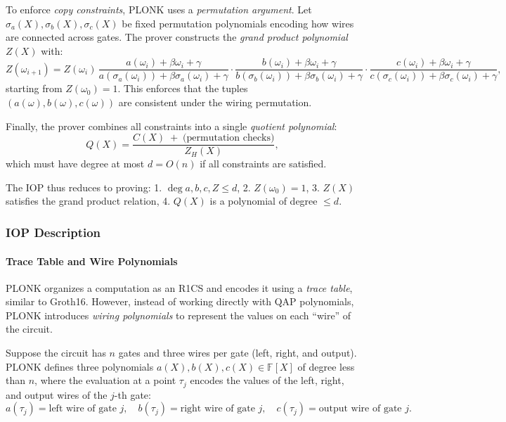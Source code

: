 To enforce \emph{copy constraints}, PLONK uses a \emph{permutation argument}.
Let $\sigma_a(X), \sigma_b(X), \sigma_c(X)$ be fixed permutation polynomials encoding how 
wires are connected across gates. The prover constructs the \emph{grand product polynomial} $Z(X)$ with:
\[
Z(\omega_{i+1}) = Z(\omega_i)\,\frac{a(\omega_i) + \beta \omega_i + \gamma}
                                   {a(\sigma_a(\omega_i)) + \beta \sigma_a(\omega_i) + \gamma}
                                   \cdot
                                   \frac{b(\omega_i) + \beta \omega_i + \gamma}
                                   {b(\sigma_b(\omega_i)) + \beta \sigma_b(\omega_i) + \gamma}
                                   \cdot
                                   \frac{c(\omega_i) + \beta \omega_i + \gamma}
                                   {c(\sigma_c(\omega_i)) + \beta \sigma_c(\omega_i) + \gamma},
\]
starting from $Z(\omega_0) = 1$. This enforces that the tuples 
$(a(\omega),b(\omega),c(\omega))$ are consistent under the wiring permutation.

Finally, the prover combines all constraints into a single \emph{quotient polynomial}:
\[
Q(X) = \frac{C(X) \;+\; \text{(permutation checks)}}{Z_H(X)},
\]
which must have degree at most $d = O(n)$ if all constraints are satisfied.

The IOP thus reduces to proving:
1. $\deg a,b,c,Z \leq d$,  
2. $Z(\omega_0) = 1$,  
3. $Z(X)$ satisfies the grand product relation,  
4. $Q(X)$ is a polynomial of degree $\leq d$.  

\subsubsection*{IOP Description}

\paragraph{Trace Table and Wire Polynomials}  
PLONK organizes a computation as an R1CS and encodes it using a \emph{trace table}, similar to Groth16.  
However, instead of working directly with QAP polynomials, PLONK introduces \emph{wiring polynomials} to represent the values on each “wire” of the circuit.  

Suppose the circuit has \(n\) gates and three wires per gate (left, right, and output).  
PLONK defines three polynomials \(a(X), b(X), c(X) \in \mathbb{F}[X]\) of degree less than \(n\), where the evaluation at a point \(\tau_j\) encodes the values of the left, right, and output wires of the \(j\)-th gate:  
\[
a(\tau_j) = \text{left wire of gate } j, \quad
b(\tau_j) = \text{right wire of gate } j, \quad
c(\tau_j) = \text{output wire of gate } j.
\]

